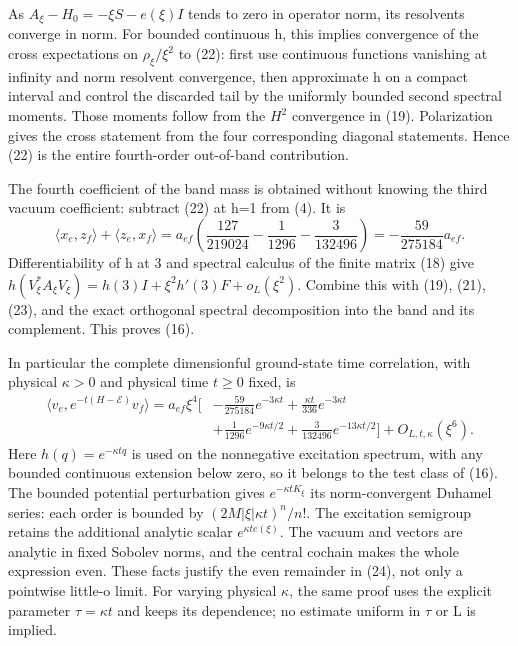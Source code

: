 \documentclass[
  11pt,
]{article}
\begin{document}
As \(A_\xi-H_0=-\xi S-e(\xi)I\) tends to zero in operator norm, its
resolvents converge in norm. For bounded continuous h, this implies
convergence of the cross expectations on \(\rho_\xi/\xi^2\) to (22):
first use continuous functions vanishing at infinity and norm resolvent
convergence, then approximate h on a compact interval and control the
discarded tail by the uniformly bounded second spectral moments. Those
moments follow from the \(H^2\) convergence in (19). Polarization gives
the cross statement from the four corresponding diagonal statements.
Hence (22) is the entire fourth-order out-of-band contribution.

The fourth coefficient of the band mass is obtained without knowing the
third vacuum coefficient: subtract (22) at h=1 from (4). It is \[
 \langle x_e,z_f\rangle+\langle z_e,x_f\rangle
 =a_{ef}\left(\frac{127}{219024}-\frac1{1296}-\frac3{132496}\right)
 =-\frac{59}{275184}a_{ef}.
\tag{23}
\] Differentiability of h at 3 and spectral calculus of the finite
matrix (18) give \(h(V_\xi^*A_\xi V_\xi)=h(3)I+\xi^2h'(3)F+o_L(\xi^2)\).
Combine this with (19), (21), (23), and the exact orthogonal spectral
decomposition into the band and its complement. This proves (16).

In particular the complete dimensionful ground-state time correlation,
with physical \(\kappa>0\) and physical time \(t\ge0\) fixed, is \[
\boxed{\begin{split}
 \langle v_e,e^{-t(H-\mathcal E)}v_f\rangle
 =a_{ef}\xi^4\biggl[&-\frac{59}{275184}e^{-3\kappa t}
       +\frac{\kappa t}{336}e^{-3\kappa t}\\
       &+\frac1{1296}e^{-9\kappa t/2}
       +\frac3{132496}e^{-13\kappa t/2}\biggr]+O_{L,t,\kappa}(\xi^6).
\end{split}}
\tag{24}
\] Here \(h(q)=e^{-\kappa tq}\) is used on the nonnegative excitation
spectrum, with any bounded continuous extension below zero, so it
belongs to the test class of (16). The bounded potential perturbation
gives \(e^{-\kappa tK_\xi}\) its norm-convergent Duhamel series: each
order is bounded by \((2M|\xi|\kappa t)^n/n!\). The excitation semigroup
retains the additional analytic scalar \(e^{\kappa t e(\xi)}\). The
vacuum and vectors are analytic in fixed Sobolev norms, and the central
cochain makes the whole expression even. These facts justify the even
remainder in (24), not only a pointwise little-o limit. For varying
physical \(\kappa\), the same proof uses the explicit parameter
\(\tau=\kappa t\) and keeps its dependence; no estimate uniform in
\(\tau\) or L is implied.
\end{document}
